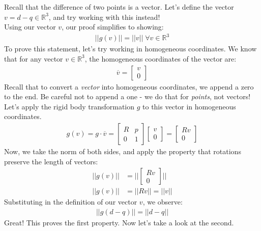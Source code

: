 \documentclass[oneside]{book}
\begin{document}
Recall that the difference of two points is a vector. Let's define the vector $v = d - q\in \mathbb{R}^3$, and try working with this instead!\\
Using our vector $v$, our proof simplifies to showing:
\begin{align}
    ||g(v)|| = ||v|| \; \forall v \in \mathbb{R}^3
\end{align}
To prove this statement, let's try working in homogeneous coordinates. We know that for any vector $v \in \mathbb{R}^3$, the homogeneous coordinates of the vector are:
\begin{align}
    \overline{v} = 
    \begin{bmatrix}
    v\\
    0
    \end{bmatrix}
\end{align}
Recall that to convert a \textit{vector} into homogeneous coordinates, we append a zero to the end. Be careful not to append a one - we do that for \textit{points}, not vectors!\\
Let's apply the rigid body transformation $g$ to this vector in homogeneous coordinates.
\begin{align}
    g(v) = g\cdot\overline{v}=
    \begin{bmatrix}
    R & p\\
    0 & 1
    \end{bmatrix}
    \begin{bmatrix}
    v\\
    0
    \end{bmatrix}
    =
    \begin{bmatrix}
    Rv\\
    0
    \end{bmatrix}
\end{align}
Now, we take the norm of both sides, and apply the property that rotations preserve the length of vectors:
\begin{align}
    ||g(v)|| &= \Big|\Big|\begin{bmatrix}
    Rv\\
    0
    \end{bmatrix}\Big|\Big|\\
    ||g(v)|| &= ||Rv|| = ||v||
\end{align}
Substituting in the definition of our vector $v$, we observe:
\begin{align}
    ||g(d - q)|| = ||d - q||
\end{align}
Great! This proves the first property. Now let's take a look at the second.\\
\end{document}
